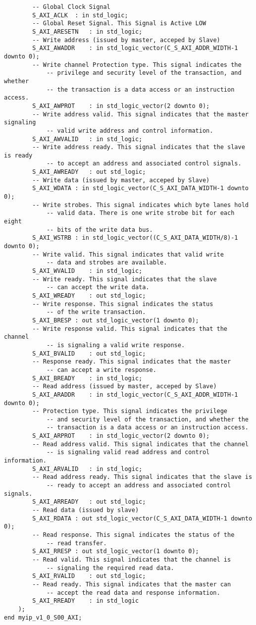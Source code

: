 \begin{lstlisting}
		-- Global Clock Signal
		S_AXI_ACLK	: in std_logic;
		-- Global Reset Signal. This Signal is Active LOW
		S_AXI_ARESETN	: in std_logic;
		-- Write address (issued by master, acceped by Slave)
		S_AXI_AWADDR	: in std_logic_vector(C_S_AXI_ADDR_WIDTH-1 downto 0);
		-- Write channel Protection type. This signal indicates the
    		-- privilege and security level of the transaction, and whether
    		-- the transaction is a data access or an instruction access.
		S_AXI_AWPROT	: in std_logic_vector(2 downto 0);
		-- Write address valid. This signal indicates that the master signaling
    		-- valid write address and control information.
		S_AXI_AWVALID	: in std_logic;
		-- Write address ready. This signal indicates that the slave is ready
    		-- to accept an address and associated control signals.
		S_AXI_AWREADY	: out std_logic;
		-- Write data (issued by master, acceped by Slave) 
		S_AXI_WDATA	: in std_logic_vector(C_S_AXI_DATA_WIDTH-1 downto 0);
		-- Write strobes. This signal indicates which byte lanes hold
    		-- valid data. There is one write strobe bit for each eight
    		-- bits of the write data bus.    
		S_AXI_WSTRB	: in std_logic_vector((C_S_AXI_DATA_WIDTH/8)-1 downto 0);
		-- Write valid. This signal indicates that valid write
    		-- data and strobes are available.
		S_AXI_WVALID	: in std_logic;
		-- Write ready. This signal indicates that the slave
    		-- can accept the write data.
		S_AXI_WREADY	: out std_logic;
		-- Write response. This signal indicates the status
    		-- of the write transaction.
		S_AXI_BRESP	: out std_logic_vector(1 downto 0);
		-- Write response valid. This signal indicates that the channel
    		-- is signaling a valid write response.
		S_AXI_BVALID	: out std_logic;
		-- Response ready. This signal indicates that the master
    		-- can accept a write response.
		S_AXI_BREADY	: in std_logic;
		-- Read address (issued by master, acceped by Slave)
		S_AXI_ARADDR	: in std_logic_vector(C_S_AXI_ADDR_WIDTH-1 downto 0);
		-- Protection type. This signal indicates the privilege
    		-- and security level of the transaction, and whether the
    		-- transaction is a data access or an instruction access.
		S_AXI_ARPROT	: in std_logic_vector(2 downto 0);
		-- Read address valid. This signal indicates that the channel
    		-- is signaling valid read address and control information.
		S_AXI_ARVALID	: in std_logic;
		-- Read address ready. This signal indicates that the slave is
    		-- ready to accept an address and associated control signals.
		S_AXI_ARREADY	: out std_logic;
		-- Read data (issued by slave)
		S_AXI_RDATA	: out std_logic_vector(C_S_AXI_DATA_WIDTH-1 downto 0);
		-- Read response. This signal indicates the status of the
    		-- read transfer.
		S_AXI_RRESP	: out std_logic_vector(1 downto 0);
		-- Read valid. This signal indicates that the channel is
    		-- signaling the required read data.
		S_AXI_RVALID	: out std_logic;
		-- Read ready. This signal indicates that the master can
    		-- accept the read data and response information.
		S_AXI_RREADY	: in std_logic
	);
end myip_v1_0_S00_AXI;


\end{lstlisting}
